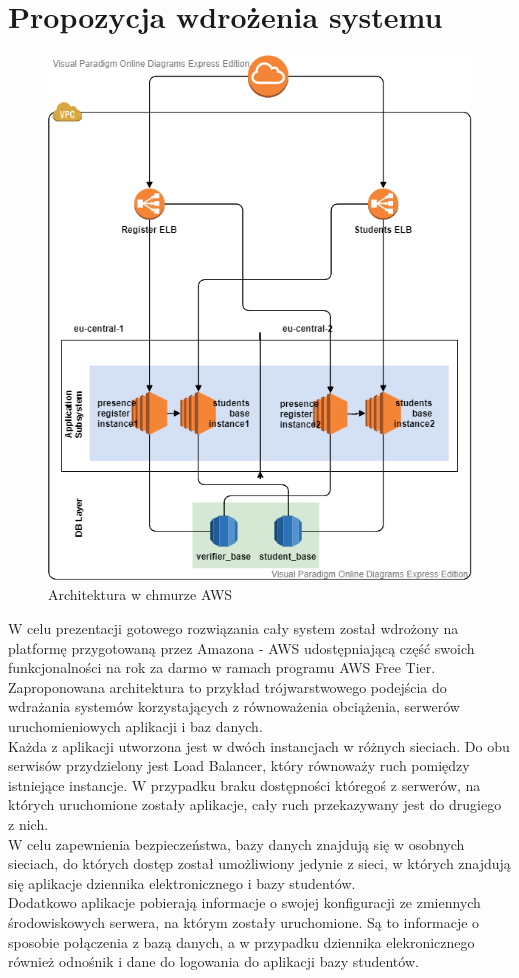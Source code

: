 \documentclass[declaration,shortabstract, mgr]{iithesis}
\begin{document}
\section{Propozycja wdrożenia systemu}
\begin{figure}[h]
\caption{Architektura w chmurze AWS}
\centering
\includegraphics[scale=0.6]{AWS.png}
\end{figure}
\indent W celu prezentacji gotowego rozwiązania cały system został wdrożony na platformę przygotowaną przez Amazona - AWS\cite{aws} udostępniającą część swoich funkcjonalności na rok za darmo w ramach programu AWS Free Tier. \\
\indent Zaproponowana architektura to przykład trójwarstwowego podejścia do wdrażania systemów korzystających z równoważenia obciążenia, serwerów uruchomieniowych aplikacji i baz danych. \\
\indent Każda z aplikacji utworzona jest w dwóch instancjach w różnych sieciach. Do obu serwisów przydzielony jest Load Balancer, który równoważy ruch pomiędzy istniejące instancje. W przypadku braku dostępności któregoś z serwerów, na których uruchomione zostały aplikacje, cały ruch przekazywany jest do drugiego z nich.\\
\indent W celu zapewnienia bezpieczeństwa, bazy danych znajdują się w osobnych sieciach, do których dostęp został umożliwiony jedynie z sieci, w których znajdują się aplikacje dziennika elektronicznego i bazy studentów. \\
\indent Dodatkowo aplikacje pobierają informacje o swojej konfiguracji ze zmiennych środowiskowych serwera, na którym zostały uruchomione. Są to informacje o sposobie połączenia z bazą danych, a w przypadku dziennika elekronicznego również odnośnik i dane do logowania do aplikacji bazy studentów.
\end{document}
